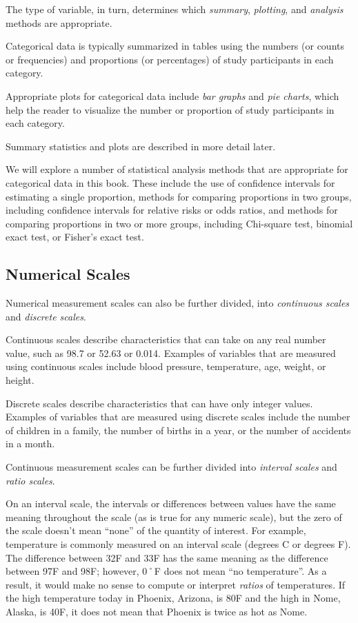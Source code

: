 \documentclass[
]{book}
\begin{document}
The type of variable, in turn, determines which \emph{summary}, \emph{plotting}, and \emph{analysis} methods are appropriate.

Categorical data is typically summarized in tables using the numbers (or counts or frequencies) and proportions (or percentages) of study participants in each category.

Appropriate plots for categorical data include \emph{bar graphs} and \emph{pie charts}, which help the reader to visualize the number or proportion of study participants in each category.

Summary statistics and plots are described in more detail later.

We will explore a number of statistical analysis methods that are appropriate for categorical data in this book. These include the use of confidence intervals for estimating a single proportion, methods for comparing proportions in two groups, including confidence intervals for relative risks or odds ratios, and methods for comparing proportions in two or more groups, including Chi-square test, binomial exact test, or Fisher's exact test.

\hypertarget{numerical-scales}{%
\subsection{Numerical Scales}\label{numerical-scales}}

Numerical measurement scales can also be further divided, into \emph{continuous scales} and \emph{discrete scales}.

Continuous scales describe characteristics that can take on any real number value, such as 98.7 or 52.63 or 0.014. Examples of variables that are measured using continuous scales include blood pressure, temperature, age, weight, or height.

Discrete scales describe characteristics that can have only integer values. Examples of variables that are measured using discrete scales include the number of children in a family, the number of births in a year, or the number of accidents in a month.

Continuous measurement scales can be further divided into \emph{interval scales} and \emph{ratio scales}.

On an interval scale, the intervals or differences between values have the same meaning throughout the scale (as is true for any numeric scale), but the zero of the scale doesn't mean ``none'' of the quantity of interest. For example, temperature is commonly measured on an interval scale (degrees C or degrees F). The difference between 32F and 33F has the same meaning as the difference between 97F and 98F; however, 0˚F does not mean ``no temperature''. As a result, it would make no sense to compute or interpret \emph{ratios} of temperatures. If the high temperature today in Phoenix, Arizona, is 80F and the high in Nome, Alaska, is 40F, it does not mean that Phoenix is twice as hot as Nome.
\end{document}
